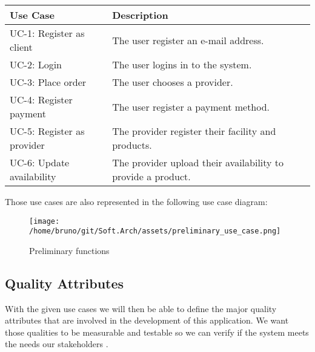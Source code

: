 \begin{table}[htb]
    \begin{tabularx}{\textwidth}{lX}
    \toprule
    Use Case & Description  \\
    \midrule
    UC-1: Register as client & The user register an e-mail address.\\
    UC-2: Login & The user logins in to the system. \\
    UC-3: Place order & The user chooses a provider. \\
    UC-4: Register payment & The user register a payment method. \\
    UC-5: Register as provider & The provider register their facility and products. \\
    UC-6: Update availability & The provider upload their availability to provide a product. \\
    \bottomrule
    \end{tabularx}
\end{table}

Those use cases are also represented in the following use case diagram:

\begin{figure}[htb]
    \centering
    \texttt{[image: /home/bruno/git/Soft.Arch/assets/preliminary\_use\_case.png]}
    \caption{Preliminary functions}
    \label{fig:predes}
\end{figure}


\subsection{Quality Attributes}

With the given use cases we will then be able to define the major quality attributes that are involved in the 
development of this application. We want those qualities to be measurable and testable so we can verify if the 
system meets the needs our stakeholders \cite{refbook:DSHC}.

